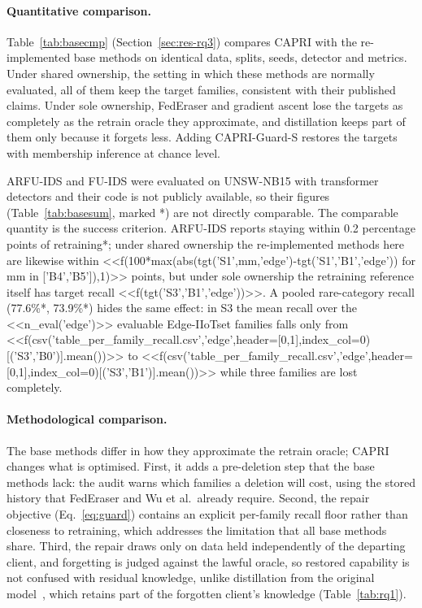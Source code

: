 \documentclass[pdflatex,sn-mathphys-num,iicol]{sn-jnl}
\begin{document}
\paragraph{Quantitative comparison.} Table~\ref{tab:basecmp} (Section~\ref{sec:res-rq3}) compares CAPRI with the re-implemented base methods on identical data, splits, seeds, detector and metrics. Under shared ownership, the setting in which these methods are normally evaluated, all of them keep the target families, consistent with their published claims. Under sole ownership, FedEraser and gradient ascent lose the targets as completely as the retrain oracle they approximate, and distillation keeps part of them only because it forgets less. Adding CAPRI-Guard-S restores the targets with membership inference at chance level.



ARFU-IDS and FU-IDS were evaluated on UNSW-NB15 with transformer detectors and their code is not publicly available, so their figures (Table~\ref{tab:basesum}, marked *) are not directly comparable. The comparable quantity is the success criterion. ARFU-IDS reports staying within 0.2 percentage points of retraining*; under shared ownership the re-implemented methods here are likewise within <<f(100*max(abs(tgt('S1',mm,'edge')-tgt('S1','B1','edge')) for mm in ['B4','B5']),1)>> points, but under sole ownership the retraining reference itself has target recall <<f(tgt('S3','B1','edge'))>>. A pooled rare-category recall (77.6\%*, 73.9\%*) hides the same effect: in S3 the mean recall over the <<n_eval('edge')>> evaluable Edge-IIoTset families falls only from <<f(csv('table_per_family_recall.csv','edge',header=[0,1],index_col=0)[('S3','B0')].mean())>> to <<f(csv('table_per_family_recall.csv','edge',header=[0,1],index_col=0)[('S3','B1')].mean())>> while three families are lost completely.

\paragraph{Methodological comparison.} The base methods differ in how they approximate the retrain oracle; CAPRI changes what is optimised. First, it adds a pre-deletion step that the base methods lack: the audit warns which families a deletion will cost, using the stored history that FedEraser and Wu et al.\ already require. Second, the repair objective (Eq.~\ref{eq:guard}) contains an explicit per-family recall floor rather than closeness to retraining, which addresses the limitation that all base methods share. Third, the repair draws only on data held independently of the departing client, and forgetting is judged against the lawful oracle, so restored capability is not confused with residual knowledge, unlike distillation from the original model~\cite{wu2022distill}, which retains part of the forgotten client's knowledge (Table~\ref{tab:rq1}).
\end{document}
